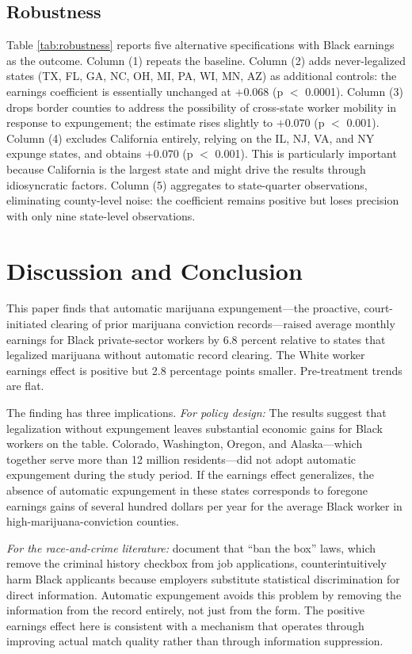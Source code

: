 \documentclass[12pt]{article}
\begin{document}
\subsection{Robustness}

Table \ref{tab:robustness} reports five alternative specifications with Black earnings as the outcome. Column (1) repeats the baseline. Column (2) adds never-legalized states (TX, FL, GA, NC, OH, MI, PA, WI, MN, AZ) as additional controls: the earnings coefficient is essentially unchanged at $+0.068$ (p $<$ 0.0001). Column (3) drops border counties to address the possibility of cross-state worker mobility in response to expungement; the estimate rises slightly to $+0.070$ (p $<$ 0.001). Column (4) excludes California entirely, relying on the IL, NJ, VA, and NY expunge states, and obtains $+0.070$ (p $<$ 0.001). This is particularly important because California is the largest state and might drive the results through idiosyncratic factors. Column (5) aggregates to state-quarter observations, eliminating county-level noise: the coefficient remains positive but loses precision with only nine state-level observations.



\section{Discussion and Conclusion}

This paper finds that automatic marijuana expungement---the proactive, court-initiated clearing of prior marijuana conviction records---raised average monthly earnings for Black private-sector workers by 6.8 percent relative to states that legalized marijuana without automatic record clearing. The White worker earnings effect is positive but 2.8 percentage points smaller. Pre-treatment trends are flat.

The finding has three implications. \textit{For policy design:} The results suggest that legalization without expungement leaves substantial economic gains for Black workers on the table. Colorado, Washington, Oregon, and Alaska---which together serve more than 12 million residents---did not adopt automatic expungement during the study period. If the earnings effect generalizes, the absence of automatic expungement in these states corresponds to foregone earnings gains of several hundred dollars per year for the average Black worker in high-marijuana-conviction counties.

\textit{For the race-and-crime literature:} \citet{aganstarr2018ban} document that ``ban the box'' laws, which remove the criminal history checkbox from job applications, counterintuitively harm Black applicants because employers substitute statistical discrimination for direct information. Automatic expungement avoids this problem by removing the information from the record entirely, not just from the form. The positive earnings effect here is consistent with a mechanism that operates through improving actual match quality rather than through information suppression.
\end{document}

